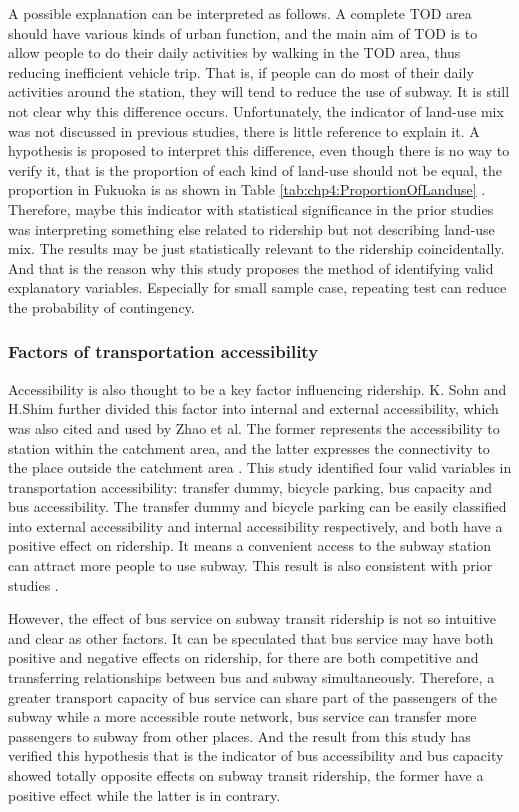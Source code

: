 %
A possible explanation can be interpreted as follows. A complete TOD area should have various kinds of urban function, and the main aim of TOD is to allow people to do their daily activities by walking in the TOD area, thus reducing inefficient vehicle trip. That is, if people can do most of their daily activities around the station, they will tend to reduce the use of subway. It is still not clear why this difference occurs. Unfortunately, the indicator of land-use mix was not discussed in previous studies, there is little reference to explain it. A hypothesis is proposed to interpret this difference, even though there is no way to verify it, that is the proportion of each kind of land-use should not be equal, the proportion in Fukuoka is as shown in Table \ref{tab:chp4:ProportionOfLanduse} \cite{bhat2007comprehensive}. Therefore, maybe this indicator with statistical significance in the prior studies was interpreting something else related to ridership but not describing land-use mix. The results may be just statistically relevant to the ridership coincidentally. And that is the reason why this study proposes the method of identifying valid explanatory variables. Especially for small sample case, repeating test can reduce the probability of contingency.

%
\subsubsection{Factors of transportation accessibility}
%
Accessibility is also thought to be a key factor influencing ridership. K. Sohn and H.Shim further divided this factor into internal and external accessibility, which was also cited and used by Zhao et al. The former represents the accessibility to station within the catchment area, and the latter expresses the connectivity to the place outside the catchment area \cite{sohn2010factors,zhao2013influences}. This study identified four valid variables in transportation accessibility: transfer dummy, bicycle parking, bus capacity and bus accessibility. The transfer dummy and bicycle parking can be easily classified into external accessibility and internal accessibility respectively, and both have a positive effect on ridership. It means a convenient access to the subway station can attract more people to use subway. This result is also consistent with prior studies \cite{gutierrez2011transit,cardozo2012application,kuby2004factors}.

%
However, the effect of bus service on subway transit ridership is not so intuitive and clear as other factors. It can be speculated that bus service may have both positive and negative effects on ridership, for there are both competitive and transferring relationships between bus and subway simultaneously. Therefore, a greater transport capacity of bus service can share part of the passengers of the subway while a more accessible route network, bus service can transfer more passengers to subway from other places. And the result from this study has verified this hypothesis that is the indicator of bus accessibility and bus capacity showed totally opposite effects on subway transit ridership, the former have a positive effect while the latter is in contrary. 

